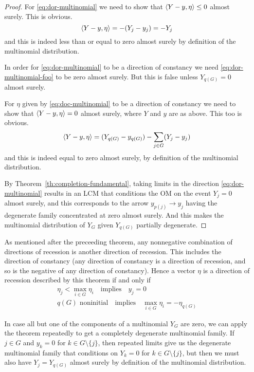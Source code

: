 \begin{proof}
For \eqref{eq:dor-multinomial} we need to show
that $\langle Y - y, \eta \rangle \le 0$ almost surely.
This is obvious.
\begin{equation} \label{eq:dor-multinomial-foo}
   \langle Y - y, \eta \rangle = - (Y_j - y_j)
   =
   - Y_j
\end{equation}
and this is indeed less than or equal to zero almost surely
by definition of the multinomial distribution.

In order for \eqref{eq:dor-multinomial} to be a direction of constancy
we need \eqref{eq:dor-multinomial-foo} to be zero almost surely.
But this is false unless $Y_{q(G)} = 0$ almost surely.

For $\eta$ given by \eqref{eq:doc-multinomial} to be a direction of
constancy we need to show
that $\langle Y - y, \eta \rangle = 0$ almost surely,
where $Y$ and $y$ are as above.
This too is obvious.
$$
   \langle Y - y, \eta \rangle = (Y_{q(G)} - y_{q(G)}) - \sum_{j \in G} (Y_j - y_j)
$$
and this is indeed equal to zero almost surely,
by definition of the multinomial distribution.

By Theorem~\ref{th:completion-fundamental}, taking limits in the direction
\eqref{eq:dor-multinomial} results in an LCM that conditions the OM on
the event $Y_j = 0$ almost surely, and this corresponds to
the arrow $y_{p(j)} \longrightarrow y_j$ having the degenerate family
concentrated at zero almost surely.  And this makes the multinomial
distribution of $Y_G$ given $Y_{q(G)}$ partially degenerate.
\end{proof}

As mentioned after the preceeding theorem, any nonnegative combination
of directions of recession is another direction of recession.  This includes
the direction of constancy (any direction of constancy is a direction
of recession, and so is the negative of any direction of constancy).
Hence a vector $\eta$ is a direction of recession described by this theorem
if and only if
\begin{gather*}
    \eta_j < \max_{i \in G} \eta_i \quad \text{implies} \quad y_j = 0
    \\
    \text{$q(G)$ noninitial} \quad \text{implies} \quad 
    \max_{i \in G} \eta_i = - \eta_{q(G)}
\end{gather*}

In case all but one of the components of a multinomial $Y_G$ are zero,
we can apply the theorem repeatedly to get a completely degenerate
multinomial family.  If $j \in G$ and $y_k = 0$ for $k \in G \setminus \{j\}$,
then repeated limits give us the degenerate multinomial family that
conditions on $Y_k = 0$ for $k \in G \setminus \{j\}$, but then we must
also have $Y_j = Y_{q(G)}$ almost surely by definition of the multinomial
distribution.

